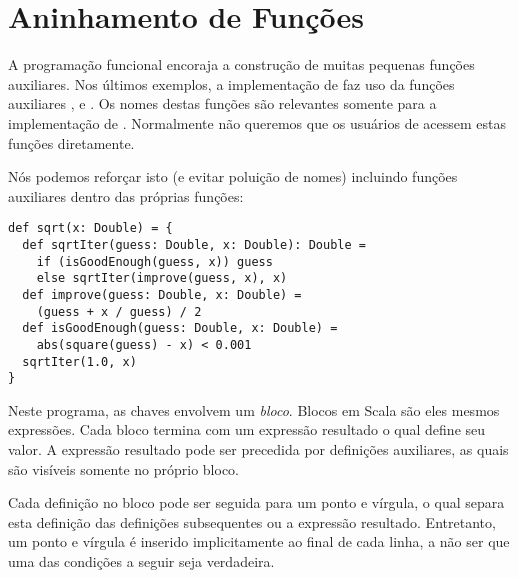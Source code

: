 \section{Aninhamento de Fun\c{c}\~{o}es}

A programa\c{c}\~{a}o funcional encoraja a constru\c{c}\~{a}o de muitas pequenas fun\c{c}\~{o}es
auxiliares. Nos \'{u}ltimos exemplos, a implementa\c{c}\~{a}o de  faz uso da
fun\c{c}\~{o}es auxiliares ,  e .
Os nomes destas fun\c{c}\~{o}es s\~{a}o relevantes somente para a implementa\c{c}\~{a}o de 
. Normalmente n\~{a}o queremos que os usu\'{a}rios de  acessem
estas fun\c{c}\~{o}es diretamente.  

N\'{o}s podemos refor\c{c}ar isto (e evitar polui\c{c}\~{a}o de nomes) incluindo
fun\c{c}\~{o}es auxiliares dentro das pr\'{o}prias fun\c{c}\~{o}es: 
\begin{lstlisting}
def sqrt(x: Double) = {
  def sqrtIter(guess: Double, x: Double): Double =
    if (isGoodEnough(guess, x)) guess
    else sqrtIter(improve(guess, x), x)
  def improve(guess: Double, x: Double) =
    (guess + x / guess) / 2
  def isGoodEnough(guess: Double, x: Double) =
    abs(square(guess) - x) < 0.001
  sqrtIter(1.0, x)
}
\end{lstlisting}

Neste programa, as chaves  envolvem um {\em bloco}. 
Blocos em Scala s\~{a}o eles mesmos express\~{o}es. Cada bloco termina com um
express\~{a}o resultado o qual define seu valor. A express\~{a}o  resultado pode 
ser precedida por defini\c{c}\~{o}es auxiliares, as quais s\~{a}o vis\'{i}veis somente no
pr\'{o}prio bloco. 

Cada defini\c{c}\~{a}o no bloco pode ser seguida para um ponto e v\'{i}rgula, o qual 
separa esta defini\c{c}\~{a}o das defini\c{c}\~{o}es subsequentes ou a express\~{a}o  resultado.
Entretanto, um ponto e v\'{i}rgula \'{e} inserido implicitamente ao final de cada linha,
a n\~{a}o ser que uma das condi\c{c}\~{o}es a seguir seja verdadeira.

